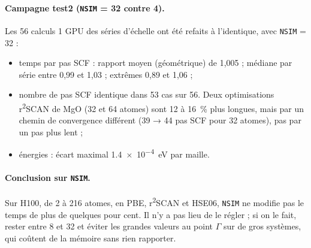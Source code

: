 \documentclass[11pt,a4paper]{article}
\newcommand{\rscan}{r\textsuperscript{2}SCAN}
\begin{document}
\paragraph{Campagne test2 (\texttt{NSIM} = 32 contre 4).} Les 56 calculs 1 GPU des séries
d'échelle ont été refaits à l'identique, avec \texttt{NSIM} = 32 :
\begin{itemize}
  \item temps par pas SCF : rapport moyen (géométrique) de 1,005 ; médiane par série entre
        0,99 et 1,03 ; extrêmes 0,89 et 1,06 ;
  \item nombre de pas SCF identique dans 53 cas sur 56. Deux optimisations \rscan{} de MgO
        (32 et 64 atomes) sont 12 à \SI{16}{\percent} plus longues, mais par un chemin de
        convergence différent (39 → 44 pas SCF pour 32 atomes), pas par un pas plus lent ;
  \item énergies : écart maximal \SI{1,4e-4}{eV} par maille.
\end{itemize}

\paragraph{Conclusion sur \texttt{NSIM}.} Sur H100, de 2 à 216 atomes, en PBE, \rscan{} et
HSE06, \texttt{NSIM} ne modifie pas le temps de plus de quelques pour cent. Il n'y a pas lieu
de le régler ; si on le fait, rester entre 8 et 32 et éviter les grandes valeurs au point
$\Gamma$ sur de gros systèmes, qui coûtent de la mémoire sans rien rapporter.
\end{document}
